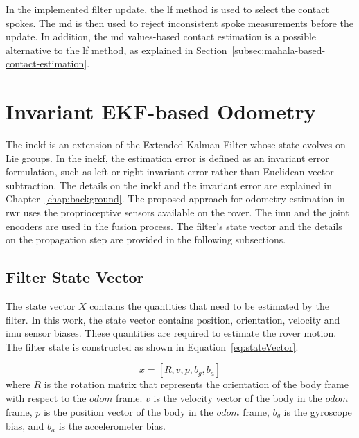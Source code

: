 \documentclass[report.tex]{subfiles}
\begin{document}
    In the implemented filter update, the \gls{lf} method is used to select the contact spokes. The \gls{md} is then used to reject inconsistent spoke measurements before the update. In addition, the \gls{md} values-based contact estimation is a possible alternative to the \gls{lf} method, as explained in Section~\ref{subsec:mahala-based-contact-estimation}.
    
    \section{Invariant EKF-based Odometry}
    
    The \gls{inekf} is an extension of the Extended Kalman Filter whose state evolves on Lie groups. In the \gls{inekf}, the estimation error is defined as an invariant error formulation, such as left or right invariant error rather than Euclidean vector subtraction. The details on the \gls{inekf} and the invariant error are explained in Chapter~\ref{chap:background}. The proposed approach for odometry estimation in \gls{rwr} uses the proprioceptive sensors available on the rover. The \gls{imu} and the joint encoders are used in the fusion process. The filter's state vector and the details on the propagation step are provided in the following subsections.
    
        
    
        
    \subsection{Filter State Vector}    
    The state vector $X$ contains the quantities that need to be estimated by the filter. In this work, the state vector contains position, orientation, velocity and \gls{imu} sensor biases. These quantities are required to estimate the rover motion. The filter state is constructed as shown in Equation~\ref{eq:stateVector}. 
    
    \begin{equation}
        x = [R, v, p, b_g, b_a]
        \label{eq:stateVector}
    \end{equation}
    where $R$ is the rotation matrix that represents the orientation of the body frame with respect to the $odom$ frame. $v$ is the velocity vector of the body in the $odom$ frame, $p$ is the position vector of the body in the $odom$ frame, $b_g$ is the gyroscope bias, and $b_a$ is the accelerometer bias. 
    
\end{document}
